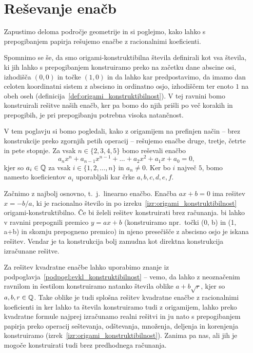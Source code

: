 \section{Reševanje enačb}
\label{pogl:enacbe}



Zapustimo deloma področje geometrije in si poglejmo, kako lahko s prepogibanjem papirja rešujemo enačbe z racionalnimi koeficienti.

Spomnimo se še, da smo origami-konstruktibilna števila definirali kot vsa števila, ki jih lahko s prepogibanjem konstruiramo preko na začetku dane abscine osi, izhodišča $(0,0)$ in točke $(1,0)$ in da lahko kar predpostavimo, da imamo dan celoten koordinatni sistem z abscisno in ordinatno osjo, izhodiščem ter enoto $1$ na obeh oseh (definicija~\ref{def:origami_konstruktibilnost}). V tej ravnini bomo konstruirali rešitve naših enačb, ker pa bomo do njih prišli po več korakih in prepogibih, je pri prepogibanju potrebna visoka natančnost.

V tem poglavju si bomo pogledali, kako z origamijem na prefinjen način -- brez konstrukcije preko zgornjih petih operacij -- rešujemo enačbe druge, tretje, četrte in pete stopnje. Za vsak $n \in \{2, 3, 4, 5\}$ bomo reševali enačbo
$$ a_n x^n + a_{n-1} x^{n-1} + \ldots + a_2 x^2 + a_1 x + a_0 = 0, $$
kjer so $a_i \in \mathbb Q$ za vsak $i \in \{1, 2, \ldots, n\}$ in $a_n \ne 0$. Ker bo $i$ največ $5$, bomo namesto koeficientov $a_i$ uporabljali kar črke $a, b, c, d, e, f$.

Začnimo z najbolj osnovno, t.\ j.\ linearno enačbo. Enačba $ax + b = 0$ ima rešitev $x = -b/a$, ki je racionalno število in po izreku~\ref{izr:origami_konstruktibilnost} origami-konstruktibilno. Če bi želeli rešitev konstruirati brez računanja. bi lahko v ravnini prepognili premico $y = ax + b$ (konstruiramo npr.\ točki (0, b) in (1, a+b) in skoznju prepogneno premico) in njeno presečišče z abscisno osjo je iskana rešitev. Vendar je ta konstrukcija bolj zamudna kot direktna konstrukcija izračunane rešitve.

Za rešitev kvadratne enačbe lahko uporabimo znanje iz podpoglavja~\ref{podpogl:evkl_konstruktibilnost} -- vemo, da lahko z neoznačenim ravnilom in šestilom konstruiramo natanko števila oblike $a + b\sqrt{r}$, kjer so $a, b, r \in \mathbb Q$. Take oblike je tudi splošna rešitev kvadratne enačbe z racionalnimi koeficienti in ker lahko ta števila konstruiramo tudi z origamijem, lahko preko kvadratne formule najprej izračunamo realni rešitvi in ju nato s prepogibanjem papirja preko operacij seštevanja, odštevanja, množenja, deljenja in korenjenja konstruiramo (izrek~\ref{izr:origami_konstruktibilnost}). Zanima pa nas, ali jih je mogoče konstruirati tudi brez predhodnega računanja.

